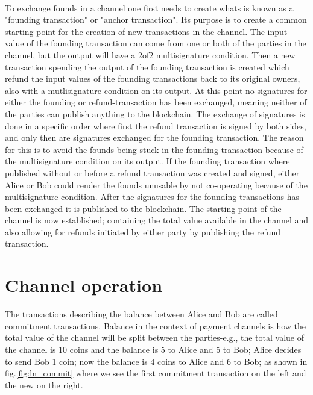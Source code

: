 \documentclass[informationsecurity]{gucmasterproject}
\begin{document}
\paragraph{}
To exchange founds in a channel one first needs to create whats is known as a "founding transaction" or "anchor transaction". Its purpose is to create a common starting point for the creation of new transactions in the channel. The input value of the founding transaction can come from one or both of the parties in the channel, but the output will have a 2of2 multisignature condition. Then a new transaction spending the output of the founding transaction is created which refund the input values of the founding transactions back to its original owners, also with a mutlisignature condition on its output. At this point no signatures for either the founding or refund-transaction has been exchanged, meaning neither of the parties can publish anything to the blockchain. The exchange of signatures is done in a specific order where first the refund transaction is signed by both sides, and only then are signatures exchanged for the founding transaction. The reason for this is to avoid the founds being stuck in the founding transaction because of the multisignature condition on its output. If the founding transaction where published without or before a refund transaction was created and signed, either Alice or Bob could render the founds unusable by not co-operating because of the multisignature condition. After the signatures for the founding transactions has been exchanged it is published to the blockchain. The starting point of the channel is now established; containing the total value available in the channel and also allowing for refunds initiated by either party by publishing the refund transaction.

\section{Channel operation}

The transactions describing the balance between Alice and Bob are called commitment transactions. Balance in the context of payment channels is how the total value of the channel will be split between the parties-e.g., the total value of the channel is 10 coins and the balance is 5 to Alice and 5 to Bob; Alice decides to send Bob 1 coin; now the balance is 4 coins to Alice and 6 to Bob; as shown in fig.\ref{fig:ln_commit} where we see the first commitment transaction on the left and the new on the right.
\end{document}
